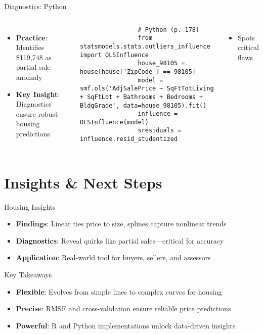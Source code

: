 \documentclass{beamer}
\begin{document}
	\begin{frame}[fragile]{Diagnostics: Python}
		\lstset{language=Python}
		\begin{columns}
			\begin{itemize}
				\item \textbf{Practice}: Identifies \$119,748 as partial sale anomaly
				\item \textbf{Key Insight}: Diagnostics ensure robust housing predictions
			\end{itemize}
			\begin{lstlisting}
				# Python (p. 178)
				from statsmodels.stats.outliers_influence import OLSInfluence
				house_98105 = house[house['ZipCode'] == 98105]
				model = smf.ols('AdjSalePrice ~ SqFtTotLiving + SqFtLot + Bathrooms + Bedrooms + BldgGrade', data=house_98105).fit()
				influence = OLSInfluence(model)
				sresiduals = influence.resid_studentized
			\end{lstlisting}
			\begin{itemize}
				\item Spots critical flaws
			\end{itemize}
		\end{columns}
	\end{frame}
	
	\section{Insights \& Next Steps}
	
	\begin{frame}{Housing Insights}
		\begin{itemize}
			\item \textbf{Findings}: Linear ties price to size, splines capture nonlinear trends
			\item \textbf{Diagnostics}: Reveal quirks like partial sales—critical for accuracy
			\item \textbf{Application}: Real-world tool for buyers, sellers, and assessors
		\end{itemize}
	\end{frame}
	
	\begin{frame}{Key Takeaways}
		\begin{itemize}
			\item \textbf{Flexible}: Evolves from simple lines to complex curves for housing
			\item \textbf{Precise}: RMSE and cross-validation ensure reliable price predictions
			\item \textbf{Powerful}: R and Python implementations unlock data-driven insights
		\end{itemize}
	\end{frame}
	
\end{document}
